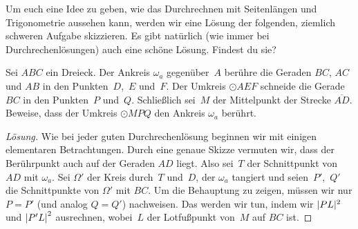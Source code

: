 Um euch eine Idee zu geben, wie das Durchrechnen mit Seitenlängen und Trigonometrie aussehen kann, werden wir eine Lösung der folgenden, ziemlich schweren Aufgabe skizzieren. Es gibt natürlich (wie immer bei Durchrechenlösungen) auch eine schöne Lösung. Findest du sie?
\begin{aufgabe*}[**]\label{aufgabe:VAIMO2018_3}
	Sei $ABC$ ein Dreieck. Der Ankreis $\omega_a$ gegenüber~$A$ berühre die Geraden $BC$, $AC$ und $AB$ in den Punkten~$D$,~$E$ und~$F$. Der Umkreis $\odot AEF$ schneide die Gerade $BC$ in den Punkten~$P$ und~$Q$. Schließlich sei~$M$ der Mittelpunkt der Strecke $\overline{AD}$. Beweise, dass der Umkreis $\odot MPQ$ den Ankreis $\omega_a$ berührt.
\end{aufgabe*}
\begin{proof}[Lösung]
	Wie bei jeder guten Durchrechenlösung beginnen wir mit einigen elementaren Betrachtungen. Durch eine genaue Skizze vermuten wir, dass der Berührpunkt auch auf der Geraden $AD$ liegt. Also sei~$T$ der Schnittpunkt von $AD$ mit $\omega_a$. Sei $\Omega'$ der Kreis durch~$T$ und~$D$, der $\omega_a$ tangiert und seien~$P'$,~$Q'$ die Schnittpunkte von $\Omega'$ mit $BC$. Um die Behauptung zu zeigen, müssen wir nur $P=P'$ (und analog $Q=Q'$) nachweisen. Das werden wir tun, indem wir $\abs{PL}^2$ und $\abs*{P'L}^2$ ausrechnen, wobei~$L$ der Lotfußpunkt von~$M$ auf $BC$ ist.
	

\end{proof}
